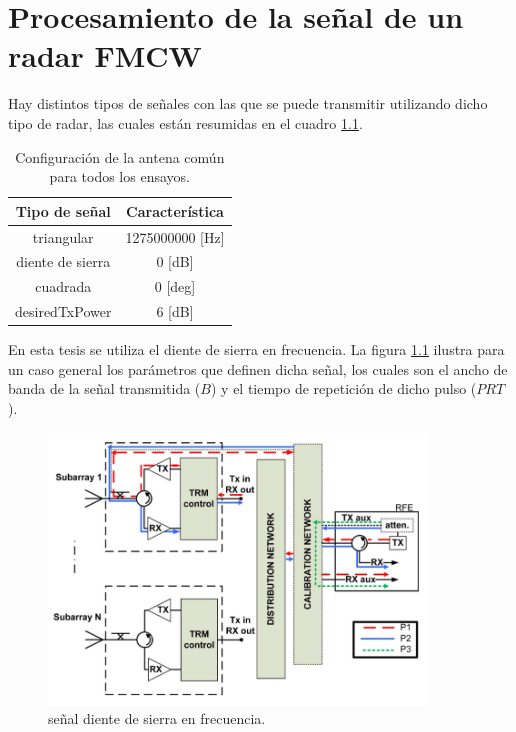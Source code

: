 
\chapter{Procesamiento de la señal de un radar FMCW}
\label{ch:classicalCalibration}




Hay distintos tipos de señales con las que se puede transmitir utilizando dicho tipo de radar, las cuales están resumidas en 
el cuadro \ref{tab:signalTypes}.
\begin{table}[H]
  \footnotesize
  \centering
  \begin{tabular}{|c|c|}
	\hline
	\textbf{Tipo de señal} & \textbf{Característica} \tabularnewline \hline 
	triangular &  1275000000 [Hz] \tabularnewline\hline 
	diente de sierra & 0 [dB] \tabularnewline \hline 
	cuadrada & 0 [deg] \tabularnewline \hline 
	desiredTxPower & 6 [dB] \tabularnewline \hline 
  \end{tabular}
  \caption{Configuración de la antena común para todos los ensayos.}
  \label{tab:signalTypes}
\end{table}

En esta tesis se utiliza el diente de sierra en frecuencia. La figura \ref{fig:sawtoothSignal} ilustra para un caso general los parámetros 
que definen dicha señal, los cuales son el ancho de banda de la señal transmitida ($B$) y el tiempo de repetición de dicho 
pulso ($PRT$).

\begin{figure}[H]
 \centering
 \includegraphics[width=10cm]{gfx/classic_cal_scheme.png}
 \caption{señal diente de sierra en frecuencia.} 
 \label{fig:sawtoothSignal}
\end{figure}

